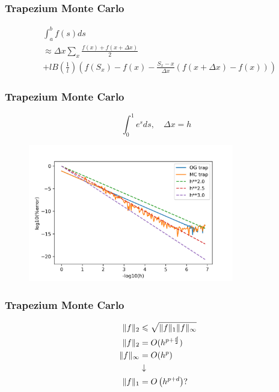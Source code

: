 \documentclass[20pt]{beamer}
\begin{document}
\begin{frame}
    \frametitle{Trapezium Monte Carlo}
    \fontsize{15}{17}\selectfont
    \begin{align}
         & \int_{a}^{b} f(s) ds                                      \\
         & \approx \Delta x \sum_{x}  \frac{f(x) + f(x+\Delta x)}{2} \\
         & + l B\left(\frac{1}{l}\right)
        \left(f(S_x) - f(x) - \frac{S_x - x}{\Delta x}(f(x+\Delta x) - f(x))\right)
    \end{align}
\end{frame}

\begin{frame}
    \frametitle{Trapezium Monte Carlo}
    \vspace{-0.9cm}
    \begin{equation}
        \int_{0}^{1} e^{s} ds, \quad \Delta x = h
    \end{equation}
    \vspace{-1cm}
    \begin{figure}[h]
        \centering
        \includegraphics[width=0.8\textwidth]{"imgs/trapMC.png"}
    \end{figure}
\end{frame}

\begin{frame}
    \frametitle{Trapezium Monte Carlo}
    \begin{align}
        \hspace{0.3cm}\|f\|_2 & \leqslant \sqrt{\|f\|_1 \|f\|_{\infty}} \\
        \|f\|_2               & = O(h^{p + \frac{d}{2}})                \\
        \|f\|_{\infty}        & = O(h^{p })                             \\
                              & \downarrow                              \\
        \|f\|_1               & = O\left(h^{p+d}\right) ?
    \end{align}
\end{frame}
\end{document}
